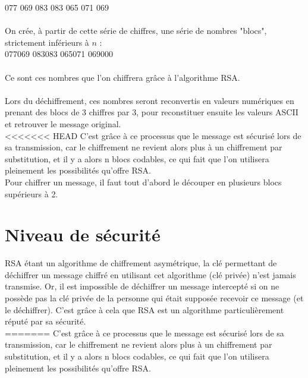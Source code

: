		077 069 083 083 065 071 069\\
		\\
		On crée, à partir de cette série de chiffres, une série de nombres "blocs", strictement inférieurs à $n$ :\\
		077069 083083 065071 069000\\
		\\
		Ce sont ces nombres que l'on chiffrera grâce à l'algorithme RSA.\\
		\\
		Lors du déchiffrement, ces nombres seront reconvertis en valeurs numériques en prenant des blocs de 3 chiffres par 3, pour reconstituer ensuite les valeurs ASCII et retrouver le message original.\\
<<<<<<< HEAD
		C'est grâce à ce processus que le message est sécurisé lors de sa transmission, car le chiffrement ne revient alors plus à un chiffrement par substitution, et il y a alors n blocs codables, ce qui fait que l'on utilisera pleinement les possibilités qu'offre RSA.\\
		Pour chiffrer un message, il faut tout d'abord le découper en plusieurs blocs supérieurs à 2.
	\section{Niveau de sécurité}
		RSA étant un algorithme de chiffrement asymétrique, la clé permettant de déchiffrer un message chiffré en utilisant cet algorithme (clé privée) n'est jamais transmise. Or, il est impossible de déchiffrer un message intercepté si on ne possède pas la clé privée de la personne qui était supposée recevoir ce message (et le déchiffrer). C'est grâce à cela que RSA est un algorithme particulièrement réputé par sa sécurité.\\
=======
		C'est grâce à ce processus que le message est sécurisé lors de sa transmission, car le chiffrement ne revient alors plus à un chiffrement par substitution, et il y a alors n blocs codables, ce qui fait que l'on utilisera pleinement les possibilités qu'offre RSA.
